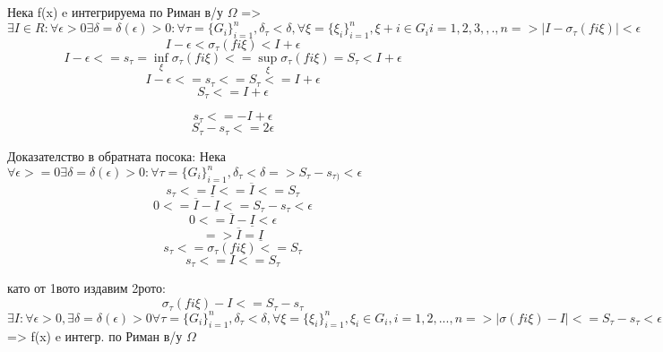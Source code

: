 \documentclass{article}
\begin{document}
Нека f(x) e интегрируема по Риман в/у  $\Omega$ => $\exists I \in R: \forall \epsilon >0 \exists \delta=\delta(\epsilon)>0: \forall \tau = \{G_{i}\}_{i=1}^{n}, \delta_{\tau}<\delta, \forall \xi=\{\xi_{i}\}_{i=1}^{n}, \xi+{i} \in G_{i} i =1, 2,3 ,,. ,n=> |I- \sigma_{\tau}(fi\xi)|< \epsilon$
$$
I- \epsilon < \sigma_{\tau}(fi\xi)< I + \epsilon
$$
$$
I- \epsilon <= s_{\tau} = \inf_{\xi}\sigma_{\tau}(fi\xi) <= \sup_{\xi} \sigma_{\tau}(fi\xi) = S_{\tau}< I + \epsilon
$$
$$
I- \epsilon <=s_{\tau} <= S_{\tau} <= I + \epsilon
$$
$$
S_{\tau} <= I + \epsilon
$$

$$
s_{\tau} <= -I + \epsilon
$$
$$S_{\tau} -s_{\tau} <= 2 \epsilon
$$

Доказателство в обратната посока:
Нека $\forall \epsilon >=0 \exists \delta=\delta(\epsilon)>0: \forall \tau= \{G_{i}\}_{i=1}^{n}, \delta_{\tau}<\delta=>S_{\tau}-s_{\tau)}<\epsilon$
$$
s_{\tau}<= \underline{I} <= \overline{I}  <= S_{\tau}
$$
$$
0<= \overline{I} - \underline{I}  <= S_{\tau} -s_{\tau} < \epsilon
$$
$$
0<= \overline{I} - \underline{I} < \epsilon
$$
$$
=>  \overline{I} = \underline{I}
$$
$$s_{\tau} <= \sigma_{\tau}(fi\xi) <= S_{\tau}$$
$$s_{\tau} <= I <= S_{\tau}$$

като от 1вото издавим 2рото:
$$
\sigma_{\tau}(fi\xi)-I <= S_{\tau}-s_{\tau}
$$
$$
\exists I: \forall \epsilon > 0, \exists \delta=\delta(\epsilon) > 0 \forall \tau = \{G_{i}\}_{i=1}^{n},\delta_{\tau}<\delta, \forall \xi=\{\xi_{i}\}_{i=1}^{n}, \xi_{i} \in G_{i}, i = 1,2,...,n
=> |\sigma(fi\xi)-I| <= S_{\tau}-s_{\tau}< \epsilon
$$
=> f(x) e интегр. по Риман в/у $\Omega$
\end{document}
